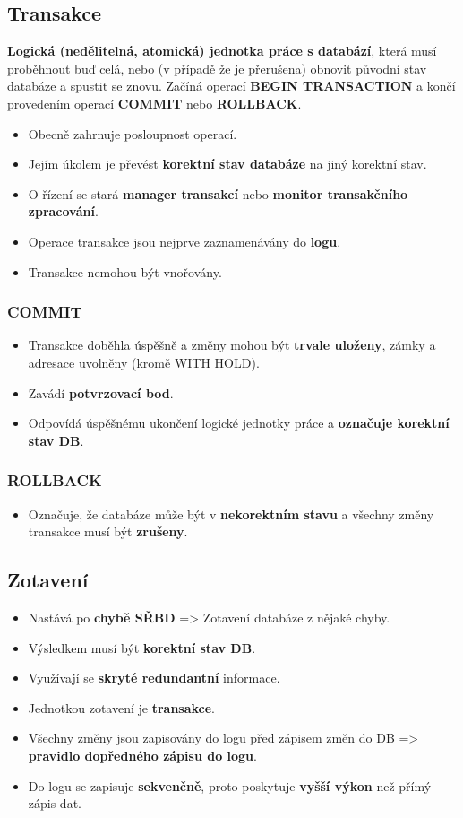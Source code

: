 \subsection{Transakce}
\textbf{Logická (nedělitelná, atomická) jednotka práce s databází}, která musí proběhnout buď celá, nebo (v případě že je přerušena) obnovit původní stav databáze a spustit se znovu. Začíná operací \textbf{BEGIN TRANSACTION} a končí provedením operací \textbf{COMMIT} nebo \textbf{ROLLBACK}.
\begin{itemize}
\item Obecně zahrnuje posloupnost operací.
\item Jejím úkolem je převést \textbf{korektní stav databáze} na jiný korektní stav.
\item O řízení se stará \textbf{manager transakcí} nebo \textbf{monitor transakčního zpracování}.
\item Operace transakce jsou nejprve zaznamenávány do\textbf{ logu}.
\item Transakce nemohou být vnořovány.
\end{itemize}

\subsubsection{COMMIT}
\begin{itemize}
	\item Transakce doběhla úspěšně a změny mohou být \textbf{trvale uloženy}, zámky a adresace uvolněny (kromě WITH HOLD).
	\item Zavádí \textbf{potvrzovací bod}.
	\item Odpovídá úspěšnému ukončení logické jednotky práce a \textbf{označuje korektní stav DB}.
\end{itemize}
\subsubsection{ROLLBACK}
\begin{itemize}
	\item Označuje, že databáze může být v \textbf{nekorektním stavu} a všechny změny transakce musí být \textbf{zrušeny}.
\end{itemize}


\subsection{Zotavení}
\begin{itemize}
\item Nastává po \textbf{chybě SŘBD} => Zotavení databáze z nějaké chyby.
\item Výsledkem musí být \textbf{korektní stav DB}.
\item Využívají se\textbf{ skryté redundantní} informace.
\item Jednotkou zotavení je \textbf{transakce}.
\item Všechny změny jsou zapisovány do logu před zápisem změn do DB => \textbf{pravidlo dopředného zápisu do logu}.
\item Do logu se zapisuje \textbf{sekvenčně}, proto poskytuje \textbf{vyšší výkon} než přímý zápis dat.
\end{itemize}

